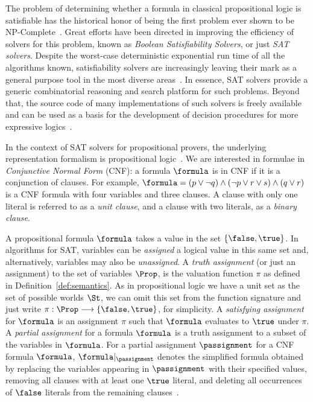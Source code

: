 The problem of determining whether a formula in classical propositional logic is
satisfiable has the historical honor of being the first problem ever shown to be
NP-Complete~\cite{Cook}. Great efforts have been directed in improving the
efficiency of solvers for this problem, known as \emph{Boolean Satisfiability
Solvers}, or just \emph{SAT solvers}. Despite the worst-case deterministic
exponential run time of all the algorithms known, satisfiability solvers are
increasingly leaving their mark as a general purpose tool in the most diverse
areas~\cite{satchapter}. In essence, SAT solvers provide a generic combinatorial
reasoning and search platform for such problems.  Beyond that, the source code
of many implementations of such solvers is freely available and can be used as a
basis for the development of decision procedures for more expressive
logics~\cite{giunchiglia2002sat}.

In the context of SAT solvers for propositional provers, the underlying
representation formalism is propositional logic~\cite{satchapter}. We are
interested in formulae in \emph{Conjunctive Normal Form} (CNF): a formula
$\formula$ is in CNF if it is a conjunction of clauses. For example, $\formula =
(p \lor \neg q) \land (\neg p \lor r \lor s) \land (q \lor r)$ is a CNF formula
with four variables and three clauses. A clause with only one literal is
referred to as a \emph{unit clause}, and a clause with two literals, as a
\emph{binary clause}.

A propositional formula $\formula$ takes a value in the set $\{\false, \true\}$. In
algorithms for SAT, variables can be \emph{assigned} a logical value in this same
set and, alternatively, variables may also be \emph{unassigned}. A \emph{truth
assignment} (or just an assignment) to the set of variables $\Prop$, is the valuation
function $\pi$ as defined in Definition~\ref{def:semantics}. As in propositional
logic we have a unit set as the set of possible worlds $\St$, we can omit this
set from the function signature and just write $\pi : \Prop \longrightarrow
\{\false,\true\}$, for simplicity. A \emph{satisfying assignment} for $\formula$
is an assignment $\pi$ such that $\formula$ evaluates to $\true$ under $\pi$.  A
\emph{partial assignment} for a formula $\formula$ is a truth assignment to a
subset of the variables in $\formula$. For a partial assignment $\passignment$
for a CNF formula $\formula$, $\formula|_\passignment$ denotes the simplified
formula obtained by replacing the variables appearing in $\passignment$ with
their specified values, removing all clauses with at least one $\true$ literal,
and deleting all occurrences of $\false$ literals from the remaining
clauses~\cite{satchapter}.   

